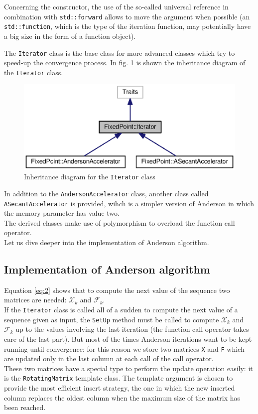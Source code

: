\documentclass[12pt]{article}
\begin{document}
		Concerning the constructor, the use of the so-called universal reference in combination with \verb|std::forward|
		allows to move the argument when possible (an \verb|std::function|, which is the type of the iteration function,
		may potentially have a big size in the form of a function object).
		
		The \verb|Iterator| class is the base class for more advanced classes which try to speed-up the convergence
		process.
		In fig. \ref{fig:1} is shown the inheritance diagram of the \verb|Iterator| class.
		\begin{figure}
			\includegraphics{./Include/inheritance.eps}
			\centering
			\caption{Inheritance diagram for the \texttt{Iterator} class}
			\label{fig:1}
		\end{figure}
		In addition to the \verb|AndersonAccelerator| class, another class called \verb|ASecantAccelerator| is provided,
		wihch is a simpler version of Anderson in which the memory parameter has value two.\\
		The derived classes make use of polymorphism to overload the function call operator.\\
		Let us dive deeper into the implementation of Anderson algorithm.
		
		
		\subsection {Implementation of Anderson algorithm}
		Equation \ref{eq:2} shows that to compute the next value of the sequence two matrices are needed:
		$\mathscr{X}_k$ and $\mathscr{F}_k$.\\
		If the \verb|Iterator| class is called all of a sudden
		to compute the next value of a sequence given as input, the \verb|SetUp| method must be called to compute $\mathscr{X}_k$ and $\mathscr{F}_k$ up
		to the values involving the last iteration (the function call operator takes care of the last part).
		But most of the times Anderson iterations want to be kept running until convergence: for this reason we
		store two matrices \verb|X| and \verb|F| which are updated only in the last column at each call of the call operator.\\
		These two matrices have a special type to perform the update operation easily: it is the \verb|RotatingMatrix|
		template class. The template argument is chosen to provide the most efficient insert strategy, the one in which
		the new inserted column replaces the oldest column when the maximum size of the matrix has been reached.
		
\end{document}

